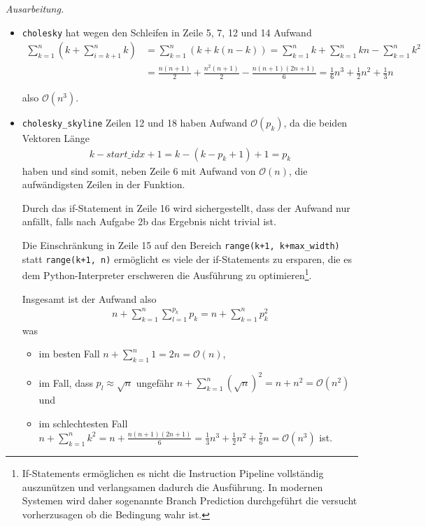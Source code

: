\documentclass[]{article}
\newenvironment{ausarbeitung}{\vspace{3mm}\noindent\textit{Ausarbeitung.}}{}
\begin{document}
\begin{ausarbeitung}
\begin{itemize}
		\item \texttt{cholesky} hat wegen den Schleifen in Zeile 5, 7, 12 und 14 Aufwand
		\begin{align*}
			\sum_{k=1}^{n}(k + \sum_{i=k+1}^{n}k) &= \sum_{k=1}^{n}(k+k(n-k)) = \sum_{k=1}^{n}k + \sum_{k=1}^{n}kn - \sum_{k=1}^{n}k^2 \\
			&= \frac{n(n+1)}{2} + \frac{n^2(n+1)}{2} - \frac{n(n+1)(2n+1)}{6} = \frac{1}{6}n^3 + \frac{1}{2}n^2 + \frac{1}{3}n
		\end{align*}
		
		also $\mathcal{O}(n^3)$.
		
		\item \texttt{cholesky\_skyline} Zeilen 12 und 18 haben Aufwand $\mathcal{O}(p_k)$, da die beiden Vektoren Länge
		\begin{align*}
			k - start\_idx + 1 = k - (k - p_k + 1) + 1 = p_k
		\end{align*}
		haben und sind somit, neben Zeile 6 mit Aufwand von $\mathcal{O}(n)$, die aufwändigsten Zeilen in der Funktion.
		
		Durch das if-Statement in Zeile 16 wird sichergestellt, dass der Aufwand nur anfällt, falls nach Aufgabe 2b das Ergebnis nicht trivial ist.
		
		Die Einschränkung in Zeile 15 auf den Bereich \texttt{range(k+1, k+max\_width)} statt \texttt{range(k+1, n)} ermöglicht es viele der if-Statements zu ersparen, die es dem Python-Interpreter erschweren die Ausführung zu optimieren\footnote{If-Statements ermöglichen es nicht die Instruction Pipeline vollständig auszunützen und verlangsamen dadurch die Ausführung. In modernen Systemen wird daher sogenannte Branch Prediction durchgeführt die versucht vorherzusagen ob die Bedingung wahr ist.}.
		
		Insgesamt ist der Aufwand also
		\begin{align*}
			n + \sum_{k=1}^{n} \sum_{l=1}^{p_k}p_k = n + \sum_{k=1}^{n} p_k^2
		\end{align*}
		was
		\begin{itemize}
			\item im besten Fall $n + \sum_{k=1}^{n} 1 = 2n = \mathcal{O}(n)$,
			\item im Fall, dass $p_l \approx \sqrt{n}$ ungefähr $n + \sum_{k=1}^{n}(\sqrt{n})^2 = n + n^2 = \mathcal{O}(n^2)$ und
			\item im schlechtesten Fall $n + \sum_{k=1}^{n}k^2 = n + \frac{n(n+1)(2n+1)}{6} = \frac{1}{3}n^3 + \frac{1}{2}n^2 + \frac{7}{6}n = \mathcal{O}(n^3)$ ist.
		\end{itemize}
	\end{itemize}
	
\end{ausarbeitung}
\end{document}
